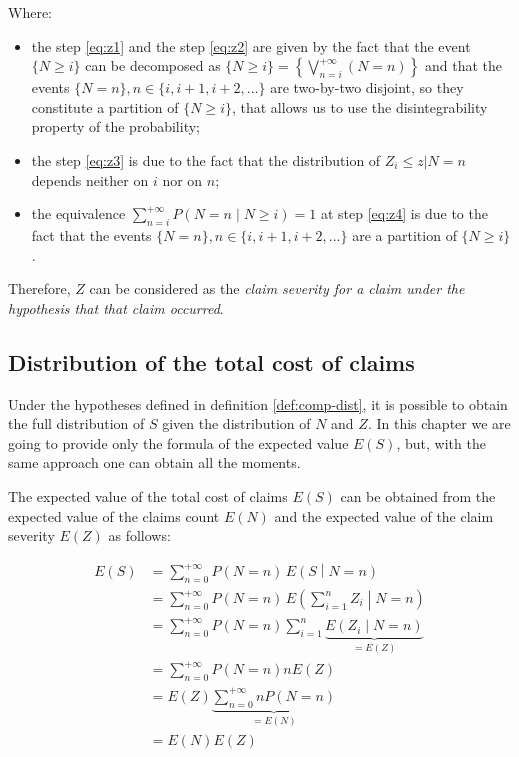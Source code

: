 \documentclass[a4paper, nobind]{templates/ociamthesis}
\providecommand{\tightlist}{%
  \setlength{\itemsep}{0pt}\setlength{\parskip}{0pt}}
\theoremstyle{definition}
\theoremstyle{definition}
\theoremstyle{definition}
\theoremstyle{remark}
\begin{document}
Where:

\begin{itemize}
\tightlist
\item
  the step \eqref{eq:z1} and the step \eqref{eq:z2} are given by the fact that the event \(\{N\ge i\}\) can be decomposed as \(\{N\ge i\} = \left\{ \bigvee_{n = i}^{+\infty}{(N=n)} \right\}\) and that the events \(\{N=n\}, n\in\{i, i+1, i+2, \dots\}\) are two-by-two disjoint, so they constitute a partition of \(\{N\ge i\}\), that allows us to use the disintegrability property of the probability;
\item
  the step \eqref{eq:z3} is due to the fact that the distribution of \(Z_i\le z | N=n\) depends neither on \(i\) nor on \(n\);
\item
  the equivalence \(\sum_{n=i}^{+\infty}{P\left( N = n \middle| N\ge i \right)} = 1\) at step \eqref{eq:z4} is due to the fact that the events \(\{N=n\}, n\in\{i, i+1, i+2, \dots\}\) are a partition of \(\{N\ge i\}\).
\end{itemize}

Therefore, \(Z\) can be considered as the \emph{claim severity for a claim under the hypothesis that that claim occurred}.

\hypertarget{chap:tcc-dist}{%
\subsection{Distribution of the total cost of claims}\label{chap:tcc-dist}}

Under the hypotheses defined in definition \ref{def:comp-dist}, it is possible to obtain the full distribution of \(S\) given the distribution of \(N\) and \(Z\). In this chapter we are going to provide only the formula of the expected value \(E(S)\), but, with the same approach one can obtain all the moments.

The expected value of the total cost of claims \(E(S)\) can be obtained from the expected value of the claims count \(E(N)\) and the expected value of the claim severity \(E(Z)\) as follows:

\begin{align}
\label{eq:s1}
E(S) & = \sum_{n=0}^{+\infty}{P(N=n) \, E\left(S \middle| N = n \right)}
\\ \label{eq:s2} & =
\sum_{n=0}^{+\infty}{P(N=n) \, E\left(\sum_{i=1}^{n}{Z_i} \middle| N = n \right)}
\\ \label{eq:s3} & =
\sum_{n=0}^{+\infty}{P(N=n) \sum_{i=1}^{n}{\underbrace{E\left( Z_i \middle| N = n \right)}_{=E(Z)}}}
\\ \label{eq:s4} & =
\sum_{n=0}^{+\infty}{P(N=n) n E(Z)}
\\ \label{eq:s5} & =
E(Z) \underbrace{\sum_{n=0}^{+\infty}{n P(N=n)}}_{=E(N)}
\\ \label{eq:s6} & =
E(N)E(Z)
\end{align}
\end{document}
